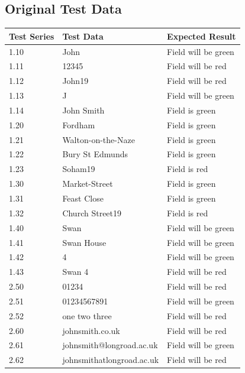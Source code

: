 \begin{landscape}
\subsection{Original Test Data}

\begin{center}
    \begin{longtable}{|p{2cm}|p{5cm}|p{8cm}|}
        \hline
        \textbf{Test Series} & \textbf{Test Data} & \textbf{Expected Result}\\ \hline
        1.10 & John & Field will be green \\ \hline
        1.11 & 12345 & Field will be red \\ \hline
        1.12 & John19 & Field will be red \\ \hline
        1.13 & J & Field will be green\\ \hline
        1.14 & John Smith &  Field is green\\ \hline
        
        1.20 & Fordham & Field is green \\ \hline
        1.21 & Walton-on-the-Naze & Field is green \\ \hline
        1.22 & Bury St Edmunds & Field is green \\ \hline
        1.23 & Soham19 & Field is red\\ \hline

        1.30 & Market-Street & Field is green \\ \hline
        1.31 & Feast Close & Field is green \\ \hline
        1.32 & Church Street19 & Field is red\\ \hline
        
        1.40 & Swan & Field will be green \\ \hline
        1.41 & Swan House & Field will be green \\ \hline
        1.42 & 4 & Field will be green \\ \hline
        1.43 & Swan 4 & Field will be red \\ \hline
        
        2.50 & 01234 & Field will be red \\ \hline
        2.51 & 01234567891 & Field will be green \\ \hline
        2.52 & one two three & Field will be red \\ \hline
        
        2.60 & johnsmith.co.uk & Field will be red \\ \hline
        2.61 & johnsmith@longroad.ac.uk & Field will be green \\ \hline
        2.62 & johnsmithatlongroad.ac.uk & Field will be red \\ \hline
        

\end{longtable}
\end{center}
\end{landscape}
